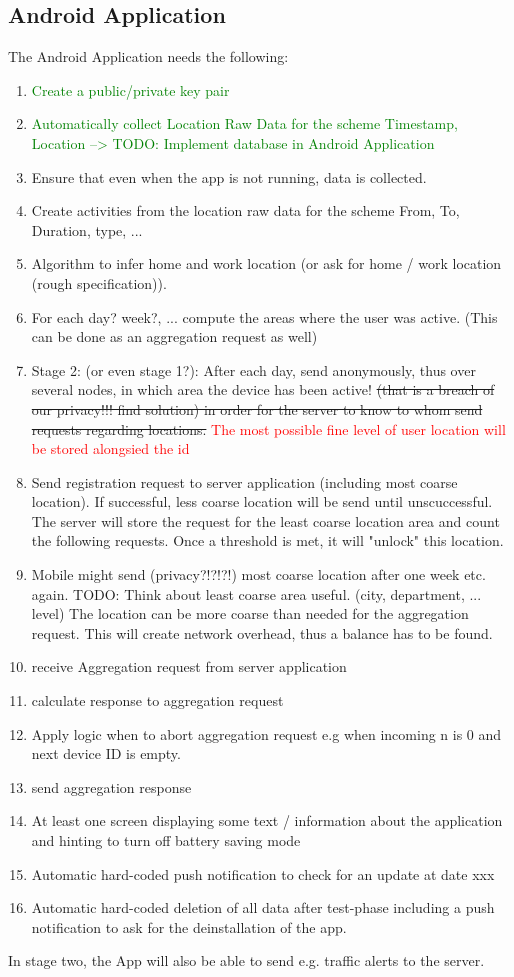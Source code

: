 \subsection{Android Application}
The Android Application needs the following:
\begin{enumerate}
	\item \textcolor{green}{Create a public/private key pair}
	\item \textcolor{green}{Automatically collect Location Raw Data for the scheme {Timestamp, Location} --> TODO: Implement database in Android Application}
	\item Ensure that even when the app is not running, data is collected.
	\item Create activities from the location raw data for the scheme {From, To, Duration, type, ...}
	\item Algorithm to infer home and work location (or ask for home / work location (rough specification)).
	\item For each day? week?, ... compute the areas where the user was active. (This can be done as an aggregation request as well)
	\item Stage 2: (or even stage 1?): After each day, send anonymously, thus over several nodes, in which area the device has been active! \sout{(that is a breach of our privacy!!! find solution) in order for the server to know to whom send requests regarding locations.} \textcolor{red}{The most possible fine level of user location will be stored alongsied the id}
	\item Send registration request to server application (including most coarse location). If successful, less coarse location will be send until unscuccessful. The server will store the request for the least coarse location area and count the following requests. Once a threshold is met, it will "unlock" this location.
	\item Mobile might send (privacy?!?!?!) most coarse location after one week etc. again. TODO: Think about least coarse area useful. (city, department, ... level)
	The location can be more coarse than needed for the aggregation request. This will create network overhead, thus a balance has to be found.
	\item receive Aggregation request from server application
	\item calculate response to aggregation request
	\item Apply logic when to abort aggregation request e.g when incoming n is 0 and next device ID is empty.
	\item send aggregation response
	\item At least one screen displaying some text / information about the application and hinting to turn off battery saving mode
	\item Automatic hard-coded push notification to check for an update at date xxx
	\item Automatic hard-coded deletion of all data after test-phase including a push notification to ask for the deinstallation of the app.
\end{enumerate}
In stage two, the App will also be able to send e.g. traffic alerts to the server.

